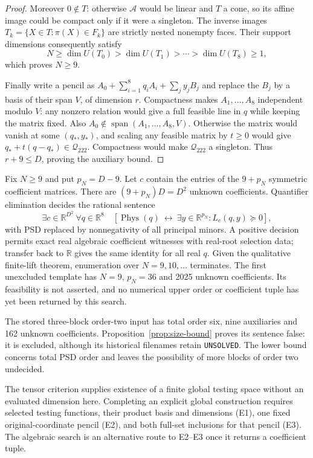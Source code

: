 \documentclass[11pt]{article}
\newcommand{\R}{\mathbb R}
\newcommand{\Q}{\mathcal Q_{222}}
\begin{document}
\begin{proof}
Moreover $0\notin T$: otherwise $\mathcal A$ would be linear and $T$
a cone, so its affine image could be compact only if it were a singleton.
The inverse images $T_k=\{X\in T:\pi(X)\in F_k\}$ are strictly nested
nonempty faces. Their support dimensions consequently satisfy
\[
 N\geq\dim U(T_0)>\dim U(T_1)>\cdots>\dim U(T_8)\geq1,
\]
which proves $N\geq9$.

Finally write a pencil as
$A_0+\sum_{i=1}^8q_iA_i+\sum_jy_jB_j$ and replace the $B_j$ by a basis
of their span $V$, of dimension $r$. Compactness makes $A_1,\ldots,A_8$
independent modulo $V$: any nonzero relation would give a full feasible
line in $q$ while keeping the matrix fixed. Also
$A_0\notin\operatorname{span}(A_1,\ldots,A_8,V)$. Otherwise the matrix
would vanish at some $(q_*,y_*)$, and scaling any feasible matrix by
$t\geq0$ would give $q_*+t(q-q_*)\in\Q$. Compactness would make $\Q$
a singleton. Thus $r+9\leq D$, proving the auxiliary bound.
\end{proof}

Fix $N\geq9$ and put $p_N=D-9$. Let $c$ contain the entries of the
$9+p_N$ symmetric coefficient matrices.
There are $(9+p_N)D=D^2$ unknown coefficients. Quantifier elimination
decides the rational sentence
\begin{equation}
 \exists c\in\R^{D^2}\ \forall q\in\R^8\quad
 \left[\operatorname{Phys}(q)\ \longleftrightarrow\
       \exists y\in\R^{p_N}:L_c(q,y)\succeq0\right],
 \label{eq:exact-search}
\end{equation}
with PSD replaced by nonnegativity of all principal minors. A positive
decision permits exact real algebraic coefficient witnesses with
real-root selection data; transfer back to $\R$ gives the same identity
for all real $q$. Given the qualitative finite-lift theorem, enumeration
over $N=9,10,\ldots$ terminates. The first unexcluded template has
$N=9$, $p_N=36$ and 2025 unknown coefficients. Its feasibility is not
asserted, and no numerical upper order or coefficient tuple has yet been
returned by this search.

The stored three-block order-two input has total order six, nine
auxiliaries and 162 unknown coefficients. Proposition~\ref{prop:size-bound}
proves its sentence false: it is excluded, although its historical
filenames retain \texttt{UNSOLVED}. The lower bound concerns total PSD
order and leaves the possibility of more blocks of order two undecided.

The tensor criterion supplies existence of a finite global testing
space without an evaluated dimension here. Completing an explicit global
construction requires selected testing functions, their product basis
and dimensions (E1), one fixed original-coordinate pencil (E2), and both
full-set inclusions for that pencil (E3). The algebraic search is an
alternative route to E2--E3 once it returns a coefficient tuple.
\end{document}
